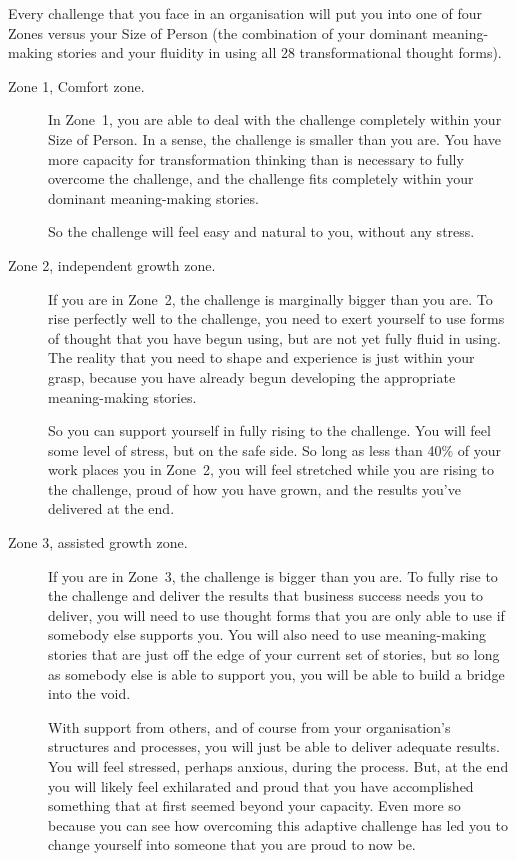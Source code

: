 Every challenge that you face in an organisation will put you into one of four Zones versus your Size of Person (the combination of your dominant meaning\hyp{}making stories and your fluidity in using all 28 transformational thought forms).


\begin{description}
\item[Zone 1, Comfort zone.] In Zone~1, you are able to deal with the challenge completely within your Size of Person.  In a sense, the challenge is smaller than you are. You have more capacity for transformation thinking than is necessary to fully overcome the challenge, and the challenge fits completely within your dominant meaning\hyp{}making stories. 


So the challenge will feel easy and natural to you, without any stress.


\item[Zone 2, independent growth zone.] If you are in Zone~2, the challenge is marginally bigger than you are. To rise perfectly well to the challenge, you need to exert yourself to use forms of thought that you have begun using, but are not yet fully fluid in using. The reality that you need to shape and experience is just within your grasp, because you have already begun developing the appropriate meaning\hyp{}making stories. 


So you can support yourself in fully rising to the challenge. You will feel some level of stress, but on the safe side. So long as less than 40\% of your work places you in Zone~2, you will feel stretched while you are rising to the challenge, proud of how you have grown, and the results you've delivered at the end.


\item[Zone 3, assisted growth zone.] If you are in Zone~3, the challenge is bigger than you are. To fully rise to the challenge and deliver the results that business success needs you to deliver, you will need to use thought forms that you are only able to use if somebody else supports you. You will also need to use meaning\hyp{}making stories that are just off the edge of your current set of stories, but so long as somebody else is able to support you, you will be able to build a bridge into the void. 


With support from others, and of course from your organisation's structures and processes, you will just be able to deliver adequate results. You will feel stressed, perhaps anxious, during the process. But, at the end you will likely feel exhilarated and proud that you have accomplished something that at first seemed beyond your capacity. Even more so because you can see how overcoming this adaptive challenge has led you to change yourself into someone that you are proud to now be.



\end{description}
